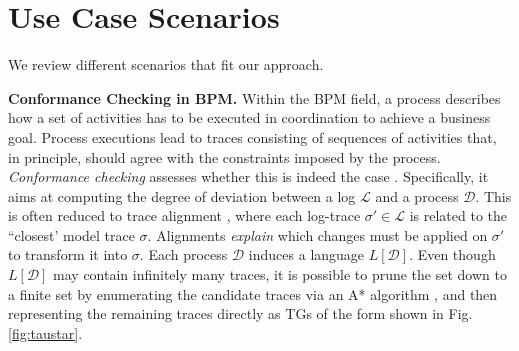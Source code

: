 \section{Use Case Scenarios}
We review different scenarios that fit our approach.

\smallskip
\noindent
\textbf{Conformance Checking in BPM.}
Within the BPM field, a process describes how a set of activities has to be executed in coordination to achieve a business goal. Process executions lead to traces consisting of sequences of activities that, in principle, should agree with the constraints imposed by the process.
\textit{Conformance checking} assesses whether this is indeed the case \cite{CDSW18}. Specifically, it aims at computing the degree of deviation between a log $\mathcal{L}$ and a process $\mathcal{D}$. This is often reduced to trace alignment \cite{DBLP:conf/edoc/AdriansyahDA11}, where each log-trace $\sigma'\in\mathcal{L}$ is related to the ``closest' model trace $\sigma$. Alignments \emph{explain} which changes must be applied on $\sigma'$ to transform it into $\sigma$.%
Each process $\mathcal{D}$ induces a language $L[\mathcal{D}]$.
Even though $L[\mathcal{D}]$ may contain infinitely many traces, it is possible to prune the set down to a finite set by enumerating the candidate traces via an A* algorithm \cite{LeoniMA12}, and then representing the remaining traces directly as TGs of the form shown in Fig. \ref{fig:taustar}. 


